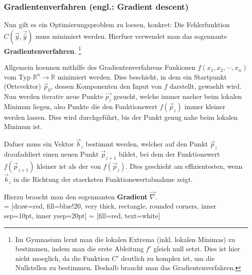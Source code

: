 \documentclass[../main]{subfiles}
\begin{document}
\subsubsection{Gradientenverfahren (engl.: Gradient descent)}
Nun gilt es ein Optimierungsproblem zu loesen, konkret: Die Fehlerfunktion $C(\vec{y},\vec{\hat{y}})$ muss minimiert werden.
Hierfuer verwendet man das sogennante \textbf{Gradientenverfahren}.
\footnote{
    Im Gymnasium lernt man die lokalen Extrema (inkl. lokalen Minimas) zu bestimmen, indem man die erste Ableitung $f'$ gleich null setzt.
    Dies ist hier nicht moeglich, da die Funktion $C'$ deutlich zu komplex ist, um die Nullstellen zu bestimmen. Deshalb braucht man das Gradientenverfahren.
}\par
\medskip
Allgemein koennen mithilfe des Gradientenverfahrens Funkionen $f(x_1, x_2, \cdots, x_n)$ vom Typ $\mathbb{R}^n \to \mathbb{R}$ minimiert werden.
Dies beschieht, in dem ein Startpunkt (Ortsvektor) $\vec{p}_0$, dessen Komponenten den Input von $f$ darstellt, gewaehlt wird.
Nun werden iterativ neue Punkte $\vec{p_z}$ gesucht, welche immer naeher beim lokalen Minimun liegen, also Punkte die den Funktionswert $f(\vec{p}_z)$ immer kleiner werden lassen.
Dies wird durchgeführt, bis der Punkt genug nahe beim lokalen Minimun ist.
\par
\medskip
Dafuer muss ein Vektor $\vec{b}_z$ bestimmt werden, welcher auf den Punkt $\vec{p}_z$ draufaddiert einen neuen Punkt $\vec{p}_{z+1}$ bildet,
bei dem der Funktionswert $f(\vec{p}_{z+1})$ kleiner ist als der von $f(\vec{p}_z)$.
Dies geschieht am effizientesten, wenn $\vec{b}_z$ in die Richtung der staerksten Funktionswertabnahme zeigt.

Hierzu braucht man den sogennanten \textbf{Gradient} $\vec{\nabla}$.\\

 = [draw=red, fill=blue!20, very thick, rectangle, rounded corners, inner sep=10pt, inner ysep=20pt]
  = [fill=red, text=white]
\end{document}
